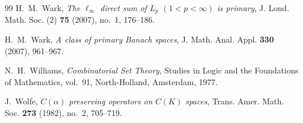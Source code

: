 \documentclass[11pt]{amsart}
\theoremstyle{plain}
\theoremstyle{definition}
\numberwithin{equation}{section}
\begin{document}
\begin{thebibliography}{99}
H.~M.~Wark,
\emph{The $\ell_\infty$ direct sum of $L_p$ $(1<p<\infty)$ is primary},
J. Lond. Math. Soc. (2) \textbf{75} (2007), no.~1, 176--186.

H.~M.~Wark,
\emph{A class of primary Banach spaces},
J. Math. Anal. Appl. \textbf{330} (2007), 961--967.

N.~H.~Williams,
\emph{Combinatorial Set Theory},
Studies in Logic and the Foundations of Mathematics, vol.~91,
North-Holland, Amsterdam, 1977.

J.~Wolfe,
\emph{$C(\alpha)$ preserving operators on $C(K)$ spaces},
Trans. Amer. Math. Soc. \textbf{273} (1982), no.~2, 705--719.


\end{thebibliography}
\end{document}
